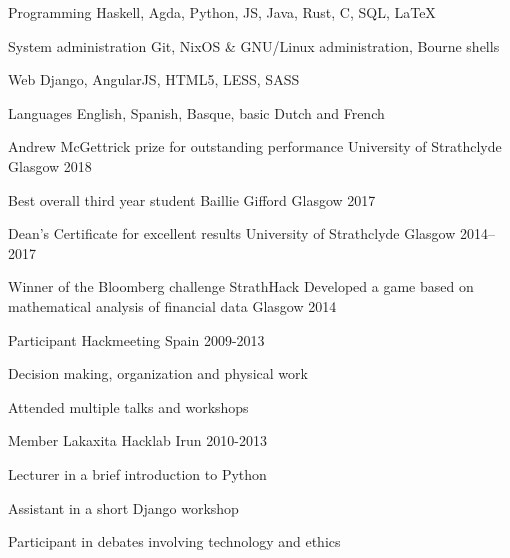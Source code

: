 \documentclass[11pt, a4paper]{awesome-cv}
\begin{document}

\begin{cvskills}
    \cvskill
      {Programming} %
      {Haskell, Agda, Python, JS, Java, Rust, C, SQL, LaTeX} %
  
    \cvskill
      {System administration} %
      {Git, NixOS \& GNU/Linux administration, Bourne shells} %
  
    \cvskill
      {Web} %
      {Django, AngularJS, HTML5, LESS, SASS} %
  
    \cvskill
      {Languages} %
      {English, Spanish, Basque, basic Dutch and French} %
\end{cvskills}


\begin{cvhonors}
  
    \cvhonor
      {Andrew McGettrick prize for outstanding performance} %
      {University of Strathclyde} %
      {Glasgow} %
      {2018} %
  
    \cvhonor
      {Best overall third year student} %
      {Baillie Gifford} %
      {Glasgow} %
      {2017} %
  
    \cvhonor
      {Dean's Certificate for excellent results} %
      {University of Strathclyde} %
      {Glasgow} %
      {2014--2017} %
  
    \cvhonor
      {Winner of the Bloomberg challenge} %
      {StrathHack \newline Developed a game based on mathematical analysis of financial data} %
      {Glasgow} %
      {2014} %
\end{cvhonors}


\begin{cventries}
    \cventry
      {Participant} %
      {Hackmeeting} %
      {Spain} %
      {2009-2013} %
      {
        \begin{cvitems} %
          \item {Decision making, organization and physical work}
          \item {Attended multiple talks and workshops}
        \end{cvitems}
      }
  
    \cventry
      {Member} %
      {Lakaxita Hacklab} %
      {Irun} %
      {2010-2013} %
      {
        \begin{cvitems} %
          \item {Lecturer in a brief introduction to Python}
          \item {Assistant in a short Django workshop}
          \item {Participant in debates involving technology and ethics}
        \end{cvitems}
      }
\end{cventries}
\end{document}
